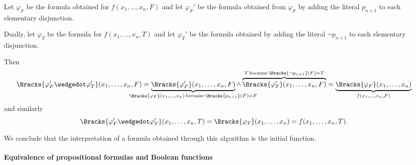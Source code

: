 \begin{defproof}
\begin{itemize}
    Let \( \varphi_F \) be the formula obtained for \( f(x_1, \ldots, x_n, F) \) and let \( \varphi_F' \) be the formula obtained from \( \varphi_F \) by adding the literal \( p_{n+1} \) to each elementary disjunction.

    Dually, let \( \varphi_T \) be the formula for \( f(x_1, \ldots, x_n, T) \) and let \( \varphi_T' \) be the formula obtained by adding the literal \( \neg p_{n+1} \) to each elementary disjunction.

    Then
    \begin{equation*}
      \Bracks{\varphi_F' \synwedge \varphi_T'}(x_1, \ldots, x_n, F)
      =
      \underbrace{\Bracks{\varphi_F'}(x_1, \ldots, x_n, F)}_{\mathclap{\Bracks{\varphi_F}(x_1, \ldots, x_n) \T*{because} \Bracks{p_{n+1}}(F) = F}} \wedge \overbrace{\Bracks{\varphi_T'}(x_1, \ldots, x_n, F)}^{T \T*{because} \Bracks{\neg p_{n+1}}(F) = T}
      =
      \underbrace{\Bracks{\varphi_F}(x_1, \ldots, x_n)}_{f(x_1, \ldots, x_n, F)}
    \end{equation*}
    and similarly
    \begin{equation*}
      \Bracks{\varphi_F' \synwedge \varphi_T'}(x_1, \ldots, x_n, T)
      =
      \Bracks{\varphi_T}(x_1, \ldots, x_n)
      =
      f(x_1, \ldots, x_n, T).
    \end{equation*}
  \end{itemize}

  We conclude that the interpretation of a formula obtained through this algorithm is the initial function.
\end{defproof}

\paragraph{Equivalence of propositional formulas and Boolean functions}

